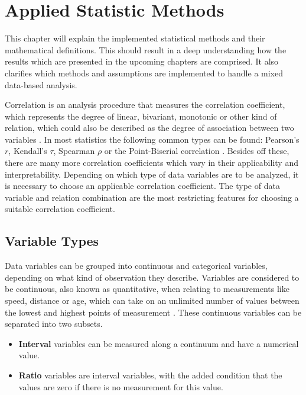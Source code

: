 \chapter{Applied Statistic Methods}
\label{definition_correlation}
This chapter will explain the implemented statistical methods and their mathematical definitions. This should result in a deep understanding how the results which are presented in the upcoming chapters are comprised. It also clarifies which methods and assumptions are implemented to handle a mixed data-based analysis.

\bigskip

Correlation is an analysis procedure that measures the correlation coefficient, which represents the degree of linear, bivariant, monotonic or other kind of relation, which could also be described as the degree of association between two variables \parencite{HerzSchlicherSiegener1992}. In most statistics the following common types can be found: Pearson's $r$, Kendall's $\tau$, Spearman  $\rho$ or the Point-Biserial correlation \parencite{Ramzai2020,SPSS2020a,SPSS2020b}. Besides off these, there are many more correlation coefficients which vary in their applicability and interpretability. Depending on which type of data variables are to be analyzed, it is necessary to choose an applicable correlation coefficient. The type of data variable and relation combination are the most restricting features for choosing a suitable correlation coefficient. 

\section{Variable Types}
\label{correlation_variable_types}
Data variables can be grouped into continuous and categorical variables, depending on what kind of observation they describe. Variables are considered to be continuous, also known as quantitative, when relating to measurements like speed, distance or age, which can take on an unlimited number of values between the lowest and highest points of measurement \parencite{McCue2007}. These continuous variables can be separated into two subsets. 

\begin{itemize}
	\item \textbf{Interval} variables can be measured along a continuum and have a numerical value. \parencite{Laerd2020}
    \item \textbf{Ratio} variables are interval variables, with the added condition that the values are zero if there is no measurement for this value. \parencite{Laerd2020}
\end{itemize}

